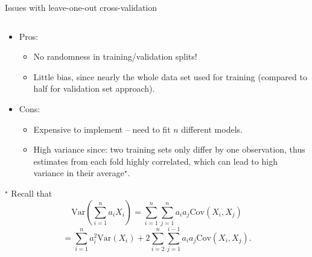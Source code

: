 \documentclass[10pt,ignorenonframetext,]{beamer}
\providecommand{\tightlist}{%
  \setlength{\itemsep}{0pt}\setlength{\parskip}{0pt}}
\begin{document}
\begin{frame}

\begin{block}{Issues with leave-one-out cross-validation}

\(~\)

\begin{itemize}
\tightlist
\item
  Pros:

  \begin{itemize}
  \tightlist
  \item
    No randomness in training/validation splits!
  \item
    Little bias, since nearly the whole data set used for training
    (compared to half for validation set approach).
  \end{itemize}
\end{itemize}

\vspace{2mm}

\begin{itemize}
\tightlist
\item
  Cons:

  \begin{itemize}
  \tightlist
  \item
    Expensive to implement -- need to fit \(n\) different models.
  \item
    High variance since: two training sets only differ by one
    observation, thus estimates from each fold highly correlated, which
    can lead to high variance in their average\(^\star\).
  \end{itemize}
\end{itemize}

\vspace{5mm}
\scriptsize

\(^\star\) Recall that
\[\text{Var}(\sum_{i=1}^na_iX_i)=\sum_{i=1}^n\sum_{j=1}^n a_ia_j\text{Cov}(X_i,X_j)\]
\[=\sum_{i=1}^na_i^2\text{Var}(X_i)+2\sum_{i=2}^n \sum_{j=1}^{i-1}
a_ia_j\text{Cov}(X_i,X_j).\]

\end{block}

\end{frame}
\end{document}
